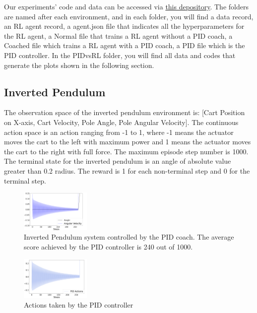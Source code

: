 \documentclass{IJCAS}
\begin{document}
Our experiments' code and data can be accessed via \href{https://github.com/BaiLiping/Coaching}{this depository}. The folders are named after each environment, and in each folder, you will find a data record, an RL agent record, a agent.json file that indicates all the hyperparameters for the RL agent, a Normal file that trains a RL agent without a PID coach, a Coached file which trains a RL agent with a PID coach, a PID file which is the PID controller. In the PIDvsRL folder, you will find all data and codes that generate the plots shown in the following section.

\subsection{Inverted Pendulum}
The observation space of the inverted pendulum environment is: [Cart Position on X-axis, Cart Velocity, Pole Angle, Pole Angular Velocity]. The continuous action space is an action ranging from -1 to 1, where -1 means the actuator moves the cart to the left with maximum power and 1 means the actuator moves the cart to the right with full force. The maximum episode step number is 1000. The terminal state for the inverted pendulum is an angle of absolute value greater than 0.2 radius. The reward is 1 for each non-terminal step and 0 for the terminal step. 

\begin{figure}[H]
  \centering 
  \includegraphics[width=0.3\textwidth]{ip_PID}
  \caption{Inverted Pendulum system controlled by the PID coach. The average score achieved by the PID controller is 240 out of 1000.}
  \label{fig:ip_pid}
\end{figure}
\begin{figure}[H]
  \centering 
  \includegraphics[width=0.3\textwidth]{ip_PID_actions}
  \caption{Actions taken by the PID controller}
  \label{fig:ip_pid_actions}
\end{figure} 
\end{document}
